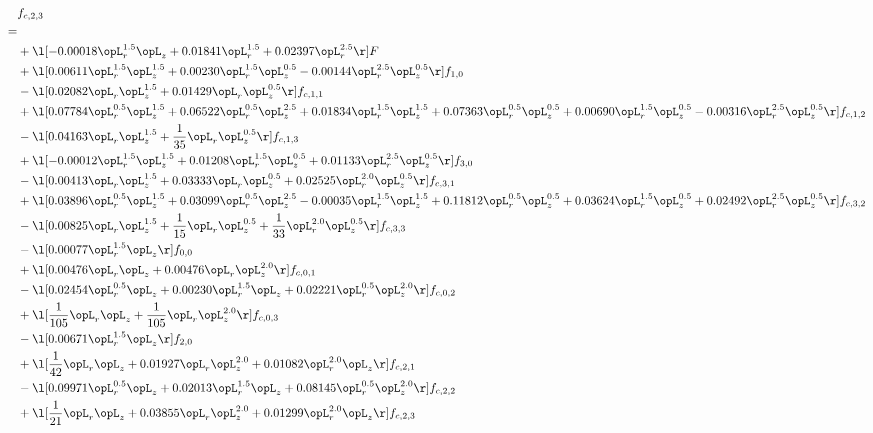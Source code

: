 \begin{alignat}{2} 
\label{eq:f_23_1} 
& f_{c,2,3} \nonumber \\ 
 = \\ 
& + \l[  -0.00018 \opL_r^{1.5} \opL_z +  0.01841 \opL_r^{1.5} +  0.02397 \opL_r^{2.5}  \r] F \nonumber \\ 
& + \l[  0.00611 \opL_r^{1.5} \opL_z^{1.5} +  0.00230 \opL_r^{1.5} \opL_z^{0.5}   -0.00144 \opL_r^{2.5} \opL_z^{0.5}  \r] f_{1,0} \nonumber \\ 
& - \l[  0.02082 \opL_r \opL_z^{1.5} +  0.01429 \opL_r \opL_z^{0.5}  \r] f_{c,1,1} \nonumber \\ 
& + \l[  0.07784 \opL_r^{0.5} \opL_z^{1.5} +  0.06522 \opL_r^{0.5} \opL_z^{2.5} +  0.01834 \opL_r^{1.5} \opL_z^{1.5} +  0.07363 \opL_r^{0.5} \opL_z^{0.5} +  0.00690 \opL_r^{1.5} \opL_z^{0.5}   -0.00316 \opL_r^{2.5} \opL_z^{0.5}  \r] f_{c,1,2} \nonumber \\ 
& - \l[  0.04163 \opL_r \opL_z^{1.5} + \frac{1}{35} \opL_r \opL_z^{0.5}  \r] f_{c,1,3} \nonumber \\ 
& + \l[  -0.00012 \opL_r^{1.5} \opL_z^{1.5} +  0.01208 \opL_r^{1.5} \opL_z^{0.5} +  0.01133 \opL_r^{2.5} \opL_z^{0.5}  \r] f_{3,0} \nonumber \\ 
& - \l[  0.00413 \opL_r \opL_z^{1.5} +  0.03333 \opL_r \opL_z^{0.5} +  0.02525 \opL_r^{2.0} \opL_z^{0.5}  \r] f_{c,3,1} \nonumber \\ 
& + \l[  0.03896 \opL_r^{0.5} \opL_z^{1.5} +  0.03099 \opL_r^{0.5} \opL_z^{2.5}   -0.00035 \opL_r^{1.5} \opL_z^{1.5} +  0.11812 \opL_r^{0.5} \opL_z^{0.5} +  0.03624 \opL_r^{1.5} \opL_z^{0.5} +  0.02492 \opL_r^{2.5} \opL_z^{0.5}  \r] f_{c,3,2} \nonumber \\ 
& - \l[  0.00825 \opL_r \opL_z^{1.5} + \frac{1}{15} \opL_r \opL_z^{0.5} + \frac{1}{33} \opL_r^{2.0} \opL_z^{0.5}  \r] f_{c,3,3} \nonumber \\ 
& - \l[  0.00077 \opL_r^{1.5} \opL_z  \r] f_{0,0} \nonumber \\ 
& + \l[  0.00476 \opL_r \opL_z +  0.00476 \opL_r \opL_z^{2.0}  \r] f_{c,0,1} \nonumber \\ 
& - \l[  0.02454 \opL_r^{0.5} \opL_z +  0.00230 \opL_r^{1.5} \opL_z +  0.02221 \opL_r^{0.5} \opL_z^{2.0}  \r] f_{c,0,2} \nonumber \\ 
& + \l[ \frac{1}{105} \opL_r \opL_z + \frac{1}{105} \opL_r \opL_z^{2.0}  \r] f_{c,0,3} \nonumber \\ 
& - \l[  0.00671 \opL_r^{1.5} \opL_z  \r] f_{2,0} \nonumber \\ 
& + \l[ \frac{1}{42} \opL_r \opL_z +  0.01927 \opL_r \opL_z^{2.0} +  0.01082 \opL_r^{2.0} \opL_z  \r] f_{c,2,1} \nonumber \\ 
& - \l[  0.09971 \opL_r^{0.5} \opL_z +  0.02013 \opL_r^{1.5} \opL_z +  0.08145 \opL_r^{0.5} \opL_z^{2.0}  \r] f_{c,2,2} \nonumber \\ 
& + \l[ \frac{1}{21} \opL_r \opL_z +  0.03855 \opL_r \opL_z^{2.0} +  0.01299 \opL_r^{2.0} \opL_z  \r] f_{c,2,3} \nonumber \\ 
\end{alignat} 



